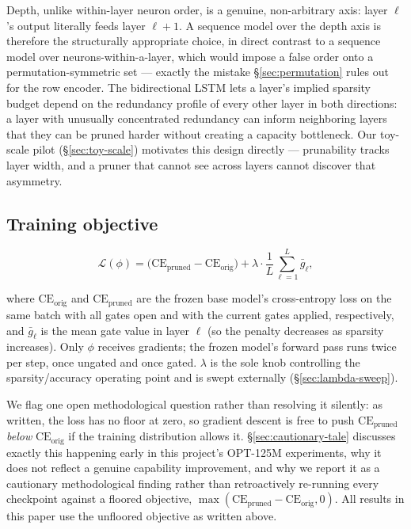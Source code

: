 \documentclass[11pt]{article}
\begin{document}
Depth, unlike within-layer neuron order, is a genuine, non-arbitrary axis:
layer $\ell$'s output literally feeds layer $\ell{+}1$. A sequence model over
the depth axis is therefore the structurally appropriate choice, in direct
contrast to a sequence model over neurons-within-a-layer, which would impose
a false order onto a permutation-symmetric set --- exactly the mistake \S\ref{sec:permutation}
rules out for the row encoder. The bidirectional LSTM lets a layer's implied
sparsity budget depend on the redundancy profile of every other layer in
both directions: a layer with unusually concentrated redundancy can inform
neighboring layers that they can be pruned harder without creating a
capacity bottleneck. Our toy-scale pilot (\S\ref{sec:toy-scale}) motivates this design directly
--- prunability tracks layer width, and a pruner that cannot see across layers
cannot discover that asymmetry.

\subsection{Training objective}
\label{sec:training-objective}

\begin{equation}
\mathcal{L}(\phi) = \big(\mathrm{CE}_{\text{pruned}} - \mathrm{CE}_{\text{orig}}\big) + \lambda \cdot \frac{1}{L}\sum_{\ell=1}^{L} \bar{g}_\ell,
\end{equation}

where $\mathrm{CE}_{\text{orig}}$ and $\mathrm{CE}_{\text{pruned}}$ are the
frozen base model's cross-entropy loss on the same batch with all gates open
and with the current gates applied, respectively, and $\bar g_\ell$ is the
mean gate value in layer $\ell$ (so the penalty decreases as sparsity
increases). Only $\phi$ receives gradients; the frozen model's forward pass
runs twice per step, once ungated and once gated. $\lambda$ is the sole knob
controlling the sparsity/accuracy operating point and is swept externally
(\S\ref{sec:lambda-sweep}).

We flag one open methodological question rather than resolving it silently:
as written, the loss has no floor at zero, so gradient descent is free to
push $\mathrm{CE}_{\text{pruned}}$ \emph{below} $\mathrm{CE}_{\text{orig}}$ if the
training distribution allows it. \S\ref{sec:cautionary-tale} discusses exactly this happening early
in this project's OPT-125M experiments, why it does not reflect a genuine
capability improvement, and why we report it as a cautionary methodological
finding rather than retroactively re-running every checkpoint against a
floored objective, $\max(\mathrm{CE}_{\text{pruned}} - \mathrm{CE}_{\text{orig}}, 0)$. All results in this paper
use the unfloored objective as written above.
\end{document}
